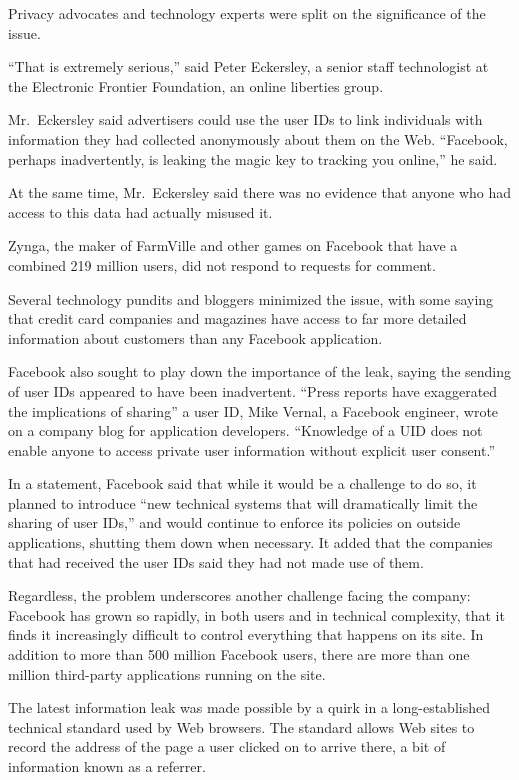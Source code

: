 ﻿\documentclass[12pt]{article}
\begin{document}
Privacy advocates and technology experts were split on the significance of the issue.

``That is extremely serious,'' said Peter Eckersley, a senior staff technologist at the Electronic
Frontier Foundation, an online liberties group.

Mr.~Eckersley said advertisers could use the user IDs to link individuals with information they had
collected anonymously about them on the Web. ``Facebook, perhaps inadvertently, is leaking the magic
key to tracking you online,'' he said.

At the same time, Mr.~Eckersley said there was no evidence that anyone who had access to this data
had actually misused it.

Zynga, the maker of FarmVille and other games on Facebook that have a combined 219 million users,
did not respond to requests for comment.

Several technology pundits and bloggers minimized the issue, with some saying that credit card
companies and magazines have access to far more detailed information about customers than any
Facebook application.

Facebook also sought to play down the importance of the leak, saying the sending of user IDs
appeared to have been inadvertent. ``Press reports have exaggerated the implications of sharing'' a
user ID, Mike Vernal, a Facebook engineer, wrote on a company blog for application developers.
``Knowledge of a UID does not enable anyone to access private user information without explicit user
consent.''

In a statement, Facebook said that while it would be a challenge to do so, it planned to introduce
``new technical systems that will dramatically limit the sharing of user IDs,'' and would continue
to enforce its policies on outside applications, shutting them down when necessary. It added that
the companies that had received the user IDs said they had not made use of them.

Regardless, the problem underscores another challenge facing the company: Facebook has grown so
rapidly, in both users and in technical complexity, that it finds it increasingly difficult to
control everything that happens on its site. In addition to more than 500 million Facebook users,
there are more than one million third-party applications running on the site.

The latest information leak was made possible by a quirk in a long-established technical standard
used by Web browsers. The standard allows Web sites to record the address of the page a user clicked
on to arrive there, a bit of information known as a referrer.
\end{document}
